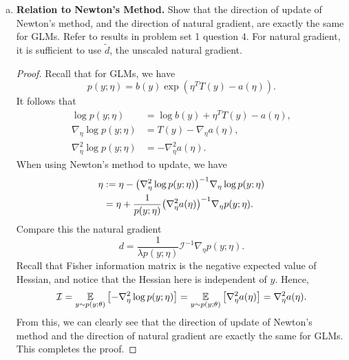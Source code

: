 \documentclass[12pt,letterpaper,boxed]{hmcpset}
\begin{document}
\begin{solution}
\begin{enumerate}[(a)]
  \item \textbf{Relation to Newton's Method.} Show that the direction of update of Newton's method, and the direction of natural gradient, are exactly the same for GLMs. Refer to results in problem set 1 question 4. For natural gradient, it is sufficient to use $\tilde{d}$, the unscaled natural gradient.
  
  \begin{proof}
    Recall that for GLMs, we have
    \[
    p(y; \eta) = b(y) \exp(\eta^T T(y) - a(\eta)).
    \]
    It follows that
    \[
    \begin{aligned}
      \log p(y; \eta) &= \log b(y) + \eta^T T(y) - a(\eta), \\
      \nabla_\eta \log p(y; \eta) &= T(y) - \nabla_\eta a(\eta), \\
      \nabla_\eta^2 \log p(y; \eta) &= - \nabla_\eta^2 a(\eta).
    \end{aligned}
    \]
    When using Newton's method to update, we have
    \[
    \begin{aligned}
      \eta &:= \eta - \qty(\nabla_\eta^2 \log p(y; \eta))^{-1} \nabla_\eta \log p(y; \eta) \\
      &= \eta + \frac{1}{p(y; \eta)} \qty(\nabla_\eta^2 a(\eta))^{-1}\nabla_\eta p(y; \eta).
    \end{aligned}
    \]
    Compare this the natural gradient
    \[
    d = \frac{1}{\lambda p(y;\eta)} \mathcal{I}^{-1} \nabla_\eta p(y; \eta).
    \]
    Recall that Fisher information matrix is the negative expected value of Hessian, and notice that the Hessian here is independent of $y$. Hence,
    \[
    \mathcal{I} = \operatorname*{\mathbb{E}}_{y \sim p(y; \theta)} \qty[-\nabla^2_\eta \log p(y; \eta)] = \operatorname*{\mathbb{E}}_{y \sim p(y; \theta)} \qty[\nabla_\eta^2 a(\eta)] = \nabla_\eta^2 a(\eta).
    \]
    From this, we can clearly see that the direction of update of Newton's method and the direction of natural gradient are exactly the same for GLMs. This completes the proof.
  \end{proof}
\end{enumerate}
\end{solution}
\end{document}
